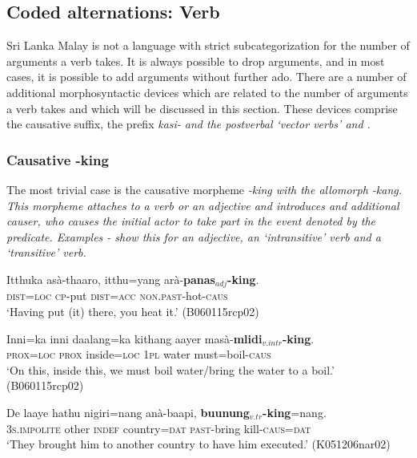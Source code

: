 \documentclass[a4paper,10pt]{article}
\begin{document}
 
\subsection{Coded alternations: Verb}

Sri Lanka Malay is not a language with strict subcategorization for the number of arguments a verb takes. It is always possible to drop arguments, and in most cases, it is possible to add arguments without further ado. There are a number of additional morphosyntactic devices which are related to the number of arguments a verb takes and which will be discussed in this section. These devices comprise the causative suffix, the prefix \em kasi- \em and the postverbal `vector verbs'  and .

\subsubsection{Causative -king}
The most trivial case is the causative morpheme \em -king \em with the allomorph \em -kang\em. This morpheme attaches to a verb or an adjective and introduces and additional causer, who causes the initial actor to take part in the event denoted by the predicate. Examples - show this for an adjective, an `intransitive' verb and a `transitive' verb.

\ea \label{ex:king:adj1}
\gll Itthuka asà-thaaro, itthu=yang arà-\textbf{panas}$_{adj}$\textbf{-king}. \\
      \textsc{dist}=\textsc{loc} \textsc{cp}-put \textsc{dist}=\textsc{acc} \textsc{non.past}-hot-\textsc{caus} \\
    `Having put (it) there, you heat it.'  (B060115rcp02)
\z

\ea \label{ex:king:intr}
\gll Inni=ka inni daalang=ka kithang aayer masà-\textbf{mlidi}$_{v.intr}$\textbf{-king}. \\ %
  \textsc{prox}=\textsc{loc} \textsc{prox} inside=\textsc{loc} \textsc{1pl} water must=boil-\textsc{caus}     \\
    `On this, inside this, we must boil water/bring the water to a boil.'  (B060115rcp02)
\z

\ea \label{ex:king:tr}
\gll De laaye hathu nigiri=nang anà-baapi, \textbf{buunung}$_{v.tr}$\textbf{-king}=nang. \\ %
      3\textsc{s.impolite} other \textsc{indef} country=\textsc{dat} \textsc{past}-bring kill-\textsc{caus}=\textsc{dat}\\
    `They brought him to another country to have him executed.'  (K051206nar02)
\z
\end{document}
